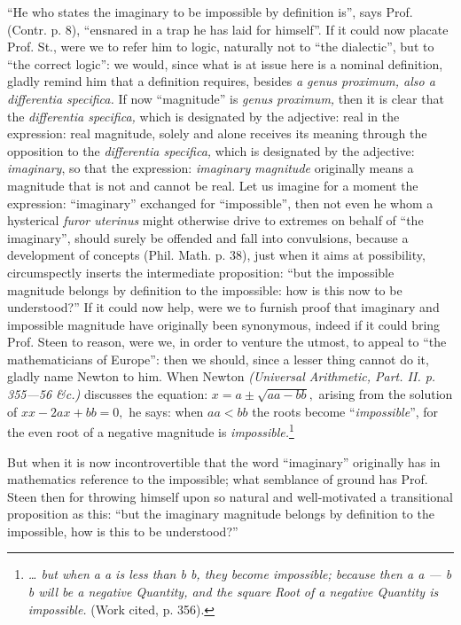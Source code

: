 \documentclass[12pt,a4paper,openany]{book}
\newcommand{\opage}[1]{\marginnote{\footnotesize\textit{[#1]}}}
\begin{document}
``He who states the imaginary to be impossible by
definition is'', says Prof. (Contr. p. 8), ``ensnared in
a trap he has laid for himself''. If it could now
placate Prof. St., were we to refer him to logic,
\opage{25}\setcounter{footnote}{0}%
naturally not to ``the dialectic'', but to ``the correct logic'':
we would, since what is at issue here is a nominal definition,
gladly remind him that a definition requires, besides
\textit{a genus proximum, also a differentia specifica.}
If now ``magnitude'' is \textit{genus proximum,} then it is clear that
the \textit{differentia specifica,} which is designated by the adjective:
real in the expression: real magnitude, solely and alone receives its
meaning through the opposition to the \textit{differentia specifica,}
which is designated by the adjective: \emph{\textit{imaginary}}, so that the expression:
\emph{\textit{imaginary}} \emph{magnitude} originally means a magnitude that
is not and cannot be real. Let us imagine for a moment the expression: ``imaginary'' exchanged for ``impossible'', then not even he whom a hysterical \textit{furor uterinus} might otherwise drive
to extremes on behalf of ``the imaginary'', should surely be offended and fall into
convulsions, because a development of concepts (Phil. Math. p. 38),
just when it aims at possibility, circumspectly inserts the
intermediate proposition: ``but the impossible magnitude belongs by
definition to the impossible: how is this now to be understood?'' If it could now help, were we to furnish proof
that imaginary and impossible magnitude have originally been
synonymous, indeed if it could bring Prof. Steen to
reason, were we, in order to venture the utmost, to appeal to
``the mathematicians of Europe'': then we should, since a lesser thing
cannot do it, gladly name Newton to him. When Newton \textit{(Universal Arithmetic, Part. II. p. 355---56 \&c.)} discusses the equation: $x = a \pm \sqrt{aa - bb},$ arising from
the solution of $xx - 2ax + bb = 0,$ he says: when
$aa < bb$ the roots become ``\emph{\textit{impossible}}'', for the even root of
a negative magnitude is \emph{\textit{impossible.}}\footnote{\textit{\dots{} but when a a is less than b b, they become impossible; because then a a --- b b will be a negative Quantity, and the square}
\textit{Root of a negative Quantity is impossible.}
(Work cited, p. 356).}

But when it is now incontrovertible that the word ``imaginary'' originally has in mathematics reference to the impossible;
\opage{26}\setcounter{footnote}{0}%
what semblance of ground has Prof. Steen then for throwing
himself upon so natural and well-motivated a transitional proposition
as this: ``but the imaginary magnitude belongs by
definition to the impossible, how is this to be understood?''
\end{document}
